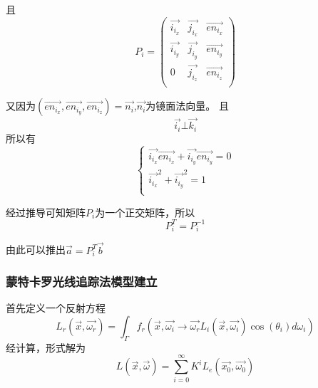 \documentclass{数学建模}
\begin{document}
且\begin{equation}
    P_i = \begin{pmatrix}
        \overrightarrow{i_{i_x}} & \overrightarrow{j_{i_x}} & \overrightarrow{en_{i_x}} \\
        \overrightarrow{i_{i_y}}& \overrightarrow{j_{i_y}} & \overrightarrow{en_{i_y}} \\
            0 & \overrightarrow{j_{i_z}} & \overrightarrow{en_{i_z}} \\
    \end{pmatrix}
\end{equation}

又因为$(\overrightarrow{en_{i_x}},\overrightarrow{en_{i_y}},\overrightarrow{en_{i_z}}) = 
\overrightarrow{n_i}$,$\overrightarrow{n_i}$为镜面法向量。
且
\begin{equation}
    \overrightarrow{i_i}  \bot \overrightarrow{k_i}
\end{equation}
所以有
\begin{equation}
    \begin{cases}
        \overrightarrow{i_{i_x}} \overrightarrow{en_{i_x}} + \overrightarrow{i_{i_y}} \overrightarrow{en_{i_y}} =0\\
        \overrightarrow{i_{i_x}}^2 + \overrightarrow{i_{i_y}}^2 = 1\\
    \end{cases}
\end{equation}


经过推导可知矩阵$P_i$为一个正交矩阵，所以
\begin{equation}
    P_i^T = P_i ^{-1}
\end{equation}

由此可以推出$ \overrightarrow{a} = P_i^{T} \overrightarrow{b} $

\subsubsection{蒙特卡罗光线追踪法模型建立}
首先定义一个反射方程
\begin{equation}
    L_r(\overrightarrow{x},\overrightarrow{\omega_r}) = \int_\varGamma f_r(\overrightarrow{x},\overrightarrow{\omega_i}\rightarrow \overrightarrow{\omega_r}
    L_i(\overrightarrow{x},\overrightarrow{\omega_i})\cos(\theta_i)d\omega_i)
\end{equation}
经计算，形式解为
\begin{equation}
    L(\overrightarrow{x},\overrightarrow{\omega }  ) = \sum_{i = 0}^{\infty}K^i L_e(\overrightarrow{x_0},\overrightarrow{\omega_0}) 
\end{equation}
\end{document}
